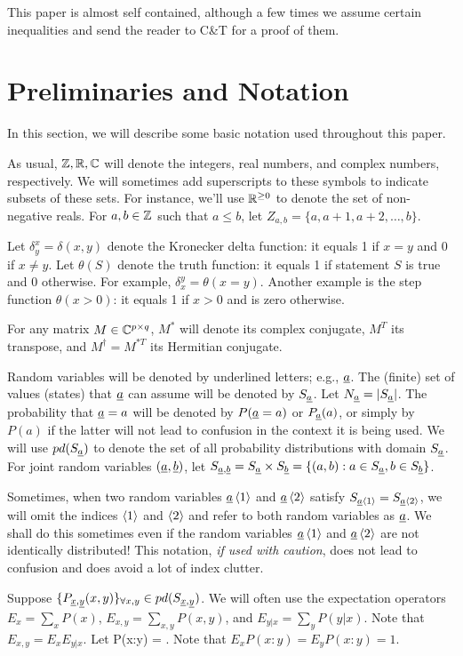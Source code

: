 This paper is almost self contained,
although a few times we
assume
certain inequalities
and send the reader to C\&T for a proof
of them.

\section{Preliminaries and Notation}

In this section, we
will describe
some basic notation
used throughout this paper.


As usual, ${\mathbb{Z}},{ \mathbb{R}}, { \mathbb{C}}$
will denote the integers, real numbers,
and complex numbers, respectively.
We will sometimes
add superscripts to these
symbols to indicate subsets of
these sets. For instance,
we'll use ${ \mathbb{R}}^{\geq 0}$
to denote the set of non-negative reals.
For $a,b\in{\mathbb{Z}}$ such that $a\leq b$,
let
 $Z_{a,b}=\{a,a+1,a+2,\ldots, b\}$.

 Let
$\delta^x_{y}=\delta(x,y)$
denote the Kronecker delta function:
it equals 1 if $x=y$ and 0 if $x\neq y$.
Let $\theta(S)$ denote the truth function:
it equals 1 if statement
$S$ is true and 0 otherwise.
For example, $\delta_x^y = \theta(x=y)$.
Another example is the step function $\theta(x>0)$:
it equals 1 if $x>0$ and is zero otherwise.

For any matrix $M\in { \mathbb{C}}^{p\times q}$,
$M^*$ will denote its complex conjugate,
$M^T$ its transpose, and $M^\dagger = M^{*T}$
its Hermitian conjugate.

Random variables will be denoted
by underlined letters; e.g.,
${\underline{a}}$.
The (finite) set of values (states) that
${\underline{a}}$ can assume will be denoted
by $S_{\underline{a}}$. Let $N_{\underline{a}}=|S_{\underline{a}}|$.
The probability that
${\underline{a}}=a$ will be denoted by $P({\underline{a}}=a)$
or $P_{\underline{a}}(a)$, or simply by $P(a)$
if the latter will not lead to confusion
in the context it is being used.
We will use $pd(S_{\underline{a}})$ to denote
the set of all probability distributions
with domain $S_{\underline{a}}$. For joint random variables
$({\underline{a}},{\underline{b}})$, let
$S_{{\underline{a}},{\underline{b}}} =
S_{\underline{a}}\times S_{\underline{b}}=
\{(a,b):a\in S_{\underline{a}}, b\in S_{\underline{b}}\}$.

Sometimes, when
two random variables ${\underline{a}}\left\langle1\right\rangle$ and
${\underline{a}}\left\langle2\right\rangle$ satisfy
$S_{{\underline{a}}\left\langle1\right\rangle}=S_{{\underline{a}}\left\langle2\right\rangle}$,
we will omit the indices $\left\langle1\right\rangle$
and $\left\langle2\right\rangle$ and refer to both
random variables as ${\underline{a}}$.
We shall do this sometimes
even if the
random variables ${\underline{a}}\left\langle1\right\rangle$
 and ${\underline{a}}\left\langle2\right\rangle$ are not identically distributed!
This notation, {\it if used with caution},
does not lead to confusion and
does avoid a lot of index clutter.

Suppose
$\{P_{{\underline{x}},{\underline{y}}}(x,y)\}_{\forall x,y}
\in pd(S_{{\underline{x}},{\underline{y}}})$.
We will often use
the expectation operators
$E_x = \sum_x P(x)$,
 $E_{x,y}=\sum_{x,y} P(x,y)$,
 and
$E_{y|x}=\sum_y P(y|x)$.
Note that $E_{x,y} = E_x E_{y|x}$.
Let
\beq
P(x:y) = 
\;.
\eeq
Note that
$E_{x} P(x:y) = E_{y} P(x:y)=1$.


